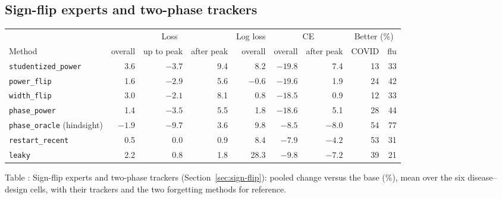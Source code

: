 \documentclass[11pt,a4paper]{article}
\theoremstyle{definition}
\theoremstyle{remark}
\begin{document}
\subsection{Sign-flip experts and two-phase trackers}
\label{sec:results-phase}
\begin{center}\small
\setlength{\tabcolsep}{4pt}
\renewcommand{\arraystretch}{1.12}
\begin{tabular}{@{}lrrrrrrrr@{}}
\toprule
 & \multicolumn{3}{c}{Loss} & Log loss & \multicolumn{2}{c}{CE} & \multicolumn{2}{c}{Better (\%)}\\
\cmidrule(lr){2-4}\cmidrule(lr){6-7}\cmidrule(l){8-9}
Method & overall & up to peak & after peak & overall & overall & after peak & COVID & flu\\
\midrule
\texttt{studentized\_power}     & 3.6    & $-3.7$ & 9.4  & 8.2    & $-19.8$ & 7.4    & 13 & 33\\
\texttt{power\_flip}            & 1.6    & $-2.9$ & 5.6  & $-0.6$ & $-19.6$ & 1.9    & 24 & 42\\
\texttt{width\_flip}            & 3.0    & $-2.1$ & 8.1  & 0.8    & $-18.5$ & 0.9    & 12 & 33\\
\addlinespace
\texttt{phase\_power}           & 1.4    & $-3.5$ & 5.5  & 1.8    & $-18.6$ & 5.1    & 28 & 44\\
\texttt{phase\_oracle} (hindsight) & $-1.9$ & $-9.7$ & 3.6 & 9.8  & $-8.5$  & $-8.0$ & 54 & 77\\
\addlinespace
\texttt{restart\_recent}        & 0.5    & 0.0    & 0.9  & 8.4    & $-7.9$  & $-4.2$ & 53 & 31\\
\texttt{leaky}                  & 2.2    & 0.8    & 1.8  & 28.3   & $-9.8$  & $-7.2$ & 39 & 21\\
\bottomrule
\end{tabular}
\end{center}
\label{tab:results-phase}
\begin{center}\small Table \thetable: Sign-flip experts and two-phase
trackers (Section~\ref{sec:sign-flip}): pooled change versus the base (\%),
mean over the six disease--design cells, with their trackers and the two
forgetting methods for reference.
\end{center}
\end{document}
